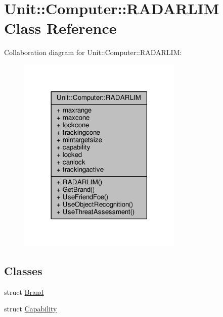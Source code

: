 \hypertarget{classUnit_1_1Computer_1_1RADARLIM}{}\section{Unit\+:\+:Computer\+:\+:R\+A\+D\+A\+R\+L\+IM Class Reference}
\label{classUnit_1_1Computer_1_1RADARLIM}


Collaboration diagram for Unit\+:\+:Computer\+:\+:R\+A\+D\+A\+R\+L\+IM\+:
\nopagebreak
\begin{figure}[H]
\begin{center}
\leavevmode
\includegraphics[width=222pt]{d6/d6e/classUnit_1_1Computer_1_1RADARLIM__coll__graph}
\end{center}
\end{figure}
\subsection*{Classes}
\begin{DoxyCompactItemize}
\item 
struct \hyperlink{structUnit_1_1Computer_1_1RADARLIM_1_1Brand}{Brand}
\item 
struct \hyperlink{structUnit_1_1Computer_1_1RADARLIM_1_1Capability}{Capability}
\end{DoxyCompactItemize}
